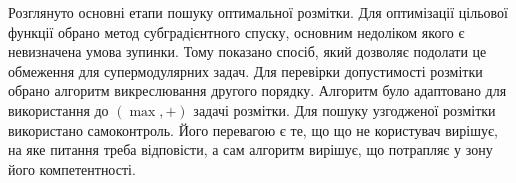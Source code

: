 \chapterConclusion

Розглянуто основні етапи пошуку оптимальної розмітки.
Для оптимізації цільової функції обрано метод субградієнтного спуску, основним недоліком
якого є невизначена умова зупинки. Тому показано спосіб, який дозволяє подолати це обмеження для супермодулярних задач.
Для перевірки допустимості розмітки обрано алгоритм викреслювання другого порядку. Алгоритм було адаптовано
для використання до $(\max,+)$ задачі розмітки. Для пошуку узгодженої розмітки використано самоконтроль. Його перевагою є те, 
що що не користувач вирішує, на яке питання треба відповісти, а сам алгоритм вирішує, що потрапляє у
зону його компетентності.